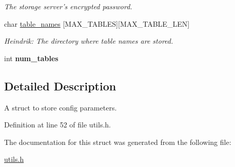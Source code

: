 \begin{DoxyCompactItemize}
\begin{DoxyCompactList}\small\item\em The storage server's encrypted password. \item\end{DoxyCompactList}\item 
\hypertarget{structconfig__params_acf98ee293155eae13cfd23b30435e133}{
char \hyperlink{structconfig__params_acf98ee293155eae13cfd23b30435e133}{table\_\-names} \mbox{[}MAX\_\-TABLES\mbox{]}\mbox{[}MAX\_\-TABLE\_\-LEN\mbox{]}}
\label{structconfig__params_acf98ee293155eae13cfd23b30435e133}

\begin{DoxyCompactList}\small\item\em Heindrik: The directory where table names are stored. \item\end{DoxyCompactList}\item 
\hypertarget{structconfig__params_ae9c49e0e93c6675a2d71e131dbb9fcb4}{
int {\bfseries num\_\-tables}}
\label{structconfig__params_ae9c49e0e93c6675a2d71e131dbb9fcb4}

\end{DoxyCompactItemize}


\subsection{Detailed Description}
A struct to store config parameters. 

Definition at line 52 of file utils.h.



The documentation for this struct was generated from the following file:\begin{DoxyCompactItemize}
\item 
\hyperlink{utils_8h}{utils.h}\end{DoxyCompactItemize}
